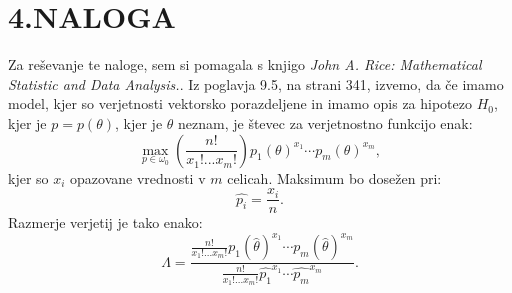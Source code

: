 \documentclass{article}
\begin{document}
\section*{4.NALOGA}
Za reševanje te naloge, sem si pomagala s knjigo \textit{John A. Rice: Mathematical Statistic and Data Analysis.}. Iz poglavja 9.5, na strani 341, izvemo, da če imamo model, kjer so verjetnosti vektorsko porazdeljene in imamo opis za hipotezo $H_0$, kjer je $p = p(\theta)$, kjer je $\theta$ neznam, je števec za verjetnostno funkcijo enak:
\begin{equation*}
\max_{p\in \omega_0} \left(  \frac{n!}{x_1!...x_m!} \right) p_1(\theta)^{x_1} \cdots p_m(\theta)^{x_m},
\end{equation*}
kjer so $x_i$ opazovane vrednosti v $m$ celicah.
Maksimum bo dosežen pri:
\begin{equation*}
\hat{p_i} =  \frac{x_i}{n}.
\end{equation*}
Razmerje verjetij je tako enako:
\begin{equation*}
\Lambda= \frac{\frac{n!}{x_1!...x_m!}  p_1(\hat{\theta})^{x_1} \cdots p_m(\hat{\theta})^{x_m}}{\frac{n!}{x_1!...x_m!}  \hat{p_1}^{x_1} \cdots \hat{p_m}^{x_m}}.
\end{equation*}
\end{document}
